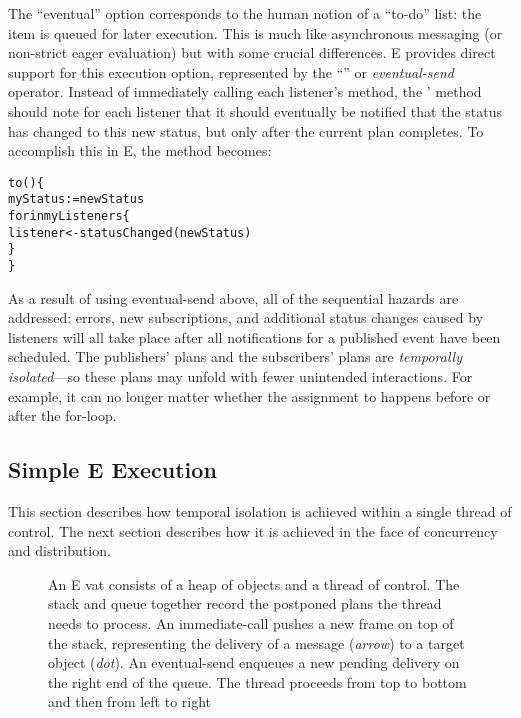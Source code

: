 \documentclass{llncs}
\begin{document}
The ``eventual'' option corresponds to the human notion of a ``to-do''
list: the item is queued for later execution.  This is much like
asynchronous messaging (or non-strict eager evaluation) but with some
crucial differences. E provides direct support for this execution
option, represented by the ``\code{<-}'' or \emph{eventual-send}
operator. 
%
%
Instead of immediately calling each listener's 
method, the '  method should note
for each listener that it should eventually be notified that the
status has changed to this new status, but only after the current plan
completes.
%
%
To accomplish this in E, the  method becomes:
%
\begin{alltt}
    to () \{
        myStatus := newStatus
        for  in myListeners \{
            listener <- statusChanged(newStatus)
        \}
    \}
\end{alltt}
%
As a result of using eventual-send above, all of the sequential
hazards are addressed: errors, new subscriptions, and additional
status changes caused by listeners will all take place after all
notifications for a published event have been scheduled.  The
publishers' plans and the subscribers' plans are \emph{temporally
isolated}---so these plans may unfold with fewer unintended
interactions. For example, it can no longer matter whether the
assignment to  happens before or after the for-loop.

\subsection{Simple E Execution}

This section describes how temporal isolation is achieved within a
single thread of control.  The next section describes how it is
achieved in the face of concurrency and distribution.

\begin{figure}
\centerline{}
\caption{An E vat consists of a heap of objects and a thread of
  control. The stack and queue together record the postponed plans the
  thread needs to process. An immediate-call pushes a new frame on top
  of the stack, representing the delivery of a message ({\it arrow})
  to a target object ({\it dot}). An eventual-send enqueues a new
  pending delivery on the right end of the queue. The thread proceeds
  from top to bottom and then from left to right}
\label{fig:stackvat}
\end{figure}
\end{document}
